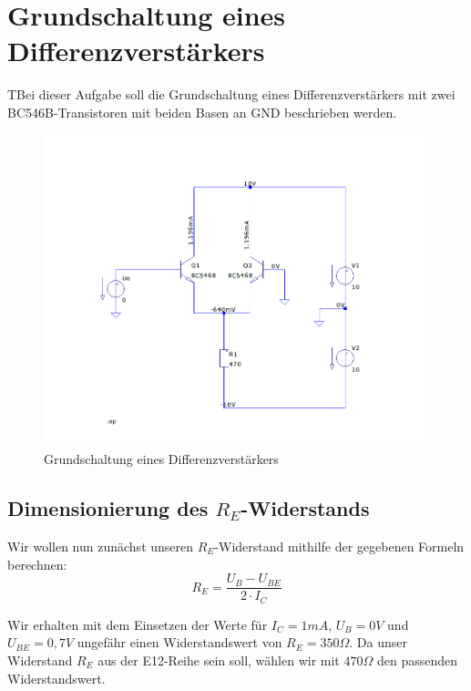 \documentclass{article}
\begin{document}
\tableofcontents


\newpage


\section{Grundschaltung eines Differenzverstärkers}
\begin{task}
  TBei dieser Aufgabe soll die Grundschaltung eines Differenzverstärkers mit zwei BC546B-Transistoren mit beiden Basen an GND beschrieben werden.
\end{task}

\begin{figure}[h]
  \centering
  \includegraphics[scale=0.5]{../assets/images/EL2P1/DeepinScreenshot_select-area_20210417230640.png}
  \caption{Grundschaltung eines Differenzverstärkers}
  \label{fig:schalt1}
\end{figure}

\subsection{Dimensionierung des $R_E$-Widerstands}
\label{sec:RE}

Wir wollen nun zunächst unseren $R_E$-Widerstand mithilfe der gegebenen Formeln berechnen:
\begin{equation}
 R_E = \frac{U_B-U_{BE}}{2\cdot I_C} 
\end{equation}

Wir erhalten mit dem Einsetzen der Werte für $I_C = 1mA$, $U_B = 0V$ und $U_{BE} = 0,7V$ ungefähr
einen Widerstandswert von $R_E = 350\Omega$. Da unser Widerstand $R_E$ aus der E12-Reihe sein soll, 
wählen wir mit $470\Omega$ den passenden Widerstandswert.
\newpage
\end{document}
